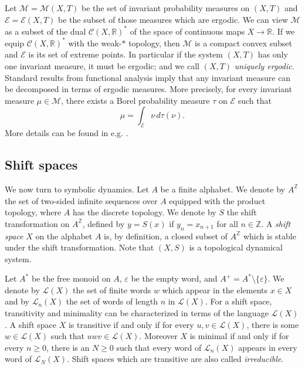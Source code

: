 \documentclass[a4paper,UKenglish,numberwithinsect,cleveref]{lipics-v2021}
\newcommand{\Z}{\mathbb{Z}}
\newcommand{\R}{\mathbb{R}}
\newcommand{\cL}{\mathcal L}
\begin{document}
Let $\mathcal{M}=\mathcal{M}(X,T)$ be the set of invariant probability measures on $(X,T)$ and $\mathcal{E} = \mathcal{E}(X,T)$ be the subset of those measures which are ergodic. We can view $\mathcal{M}$ as a subset of the dual $\mathcal C(X,\R)^*$ of the space of continuous maps $X\to \R$. If we equip $\mathcal C(X,\R)^*$ with the weak-$*$ topology, then $\mathcal{M}$ is a compact convex subset and $\mathcal{E}$ is its set of extreme points. In particular if the system $(X,T)$ has only one invariant measure, it must be ergodic; and we call $(X,T)$ \emph{uniquely ergodic}. Standard results from functional analysis imply that any invariant measure can be decomposed in terms of ergodic measures. More precisely, for every invariant measure $\mu\in\mathcal{M}$, there exists a Borel probability measure $\tau$ on $\mathcal E$ such that
\begin{equation}
    \mu=\int_{\mathcal E}\nu \,d\tau(\nu).\label{eqErgodicDecomposition}
\end{equation}
More details can be found in e.g. \cite[Chapter 12]{book/Phelps2001}. 

\subsection{Shift spaces}\label{subsec:defsubshift}

We now turn to symbolic dynamics. Let $A$ be a finite alphabet. We denote by $A^\Z$ the set of two-sided infinite sequences over $A$ equipped with the product topology, where $A$ has the discrete topology. We denote by $S$ the shift transformation on $A^\Z$, defined by $y=S(x)$ if $y_n=x_{n+1}$ for all $n\in\Z$. A \emph{shift space} $X$ on the alphabet $A$ is, by definition, a closed subset of $A^\Z$ which is stable under the shift transformation. Note that $(X,S)$ is a topological dynamical system. 

Let $A^*$ be the free monoid on $A$, $\varepsilon$ be the empty word, and $A^+=A^*\setminus\{\varepsilon\}$. We denote by $\cL(X)$ the set of finite words $w$ which appear in the elements $x\in X$ and by $\cL_n(X)$ the set of words of length $n$ in $\cL(X)$. For a shift space, transitivity and minimality can be characterized in terms of the language $\cL(X)$. A shift space $X$ is transitive if and only if for every $u,v\in\cL(X)$, there is some $w\in\cL(X)$ such that $uwv\in\cL(X)$. Moreover $X$ is minimal if and only if for every $n\ge 0$, there is an $N\ge 0$ such that every word of $\cL_n(X)$ appears in every word of $\cL_N(X)$. Shift spaces which are transitive are also called \emph{irreducible}.
\end{document}
